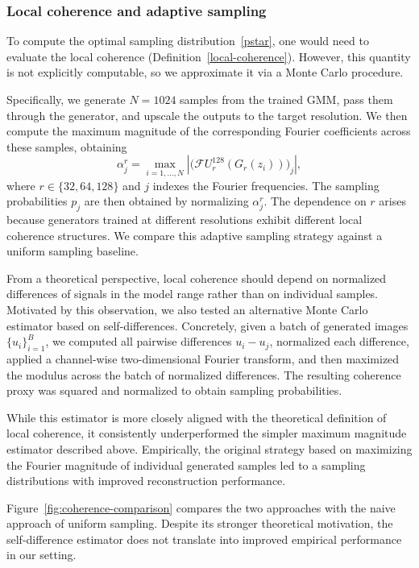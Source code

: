 \documentclass[a4paper,oneside]{amsart}
\begin{document}
\subsubsection{Local coherence and adaptive sampling}

To compute the optimal sampling distribution~\eqref{pstar}, one would need to evaluate the local coherence (Definition~\ref{local-coherence}). However, this quantity is not explicitly computable, so we approximate it via a Monte Carlo procedure.

Specifically, we generate $N = 1024$ samples from the trained GMM, pass them through the generator, and upscale the outputs to the target resolution. We then compute the maximum magnitude of the corresponding Fourier coefficients across these samples, obtaining
\[
\alpha^r_j = \max_{i = 1,\dots,N} 
\left| \bigl(\mathcal{F} U^{128}_r (G_r(z_i))\bigr)_j \right|,
\]
where $r \in \{32, 64, 128\}$ and $j$ indexes the Fourier frequencies. The sampling probabilities $p_j$ are then obtained by normalizing $\alpha^r_j$. The dependence on $r$ arises because generators trained at different resolutions exhibit different local coherence structures. We compare this adaptive sampling strategy against a uniform sampling baseline.

From a theoretical perspective, local coherence should depend on normalized differences of signals in the model range rather than on individual samples. Motivated by this observation, we also tested an alternative Monte Carlo estimator based on self-differences. Concretely, given a batch of generated images $\{u_i\}_{i=1}^B$, we computed all pairwise differences $u_i - u_j$, normalized each difference, applied a channel-wise two-dimensional Fourier transform, and then maximized the modulus across the batch of normalized differences. The resulting coherence proxy was squared and normalized to obtain sampling probabilities.

While this estimator is more closely aligned with the theoretical definition of local coherence, it consistently underperformed the simpler maximum magnitude estimator described above. Empirically, the original strategy based on maximizing the Fourier magnitude of individual generated samples led to a sampling distributions with improved reconstruction performance.

Figure~\ref{fig:coherence-comparison} compares the two approaches with the naive approach of uniform sampling. Despite its stronger theoretical motivation, the self-difference estimator does not translate into improved empirical performance in our setting.
\end{document}
